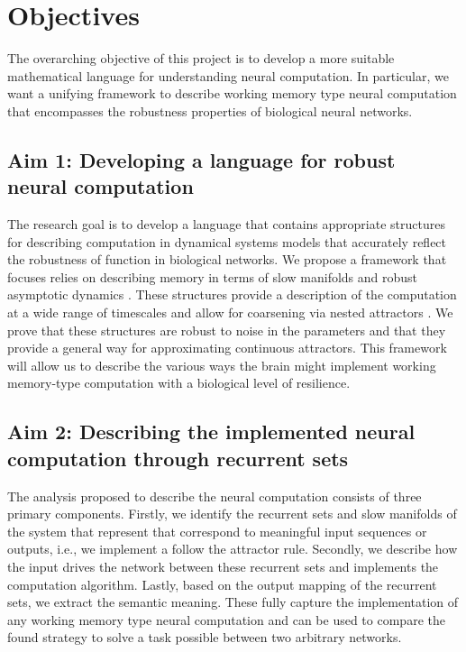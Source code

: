 \documentclass[12pt,letterpaper, onecolumn]{article}
\theoremstyle{definition}
\theoremstyle{remark}
\begin{document}
%


\newpage
\section{Objectives}
The overarching objective of this project is to develop a more suitable mathematical language for understanding neural computation. In particular, we want a unifying framework to describe working memory type neural computation that encompasses the robustness properties of biological neural networks.

\subsection*{Aim 1: Developing a language for robust neural computation}
The research goal is to develop a language that contains appropriate structures for describing computation in dynamical systems models that accurately reflect the robustness of function in biological networks.
We propose a framework that focuses relies on describing memory in terms of slow manifolds \citep{ghazizadeh2021slow} and robust asymptotic dynamics \citep{casey1996}.
These structures provide a description of the computation at a wide range of timescales and allow for coarsening via nested attractors \citep{braun2010}.
We prove that these structures are robust to noise in the parameters \citep{Park2023a} and that they provide a general way for approximating continuous attractors.
This framework will allow us to describe the various ways the brain might implement working memory-type computation with a biological level of resilience.


\subsection*{Aim 2: Describing the implemented neural computation through recurrent sets}
The analysis proposed to describe the neural computation consists of three primary components. Firstly, we identify the recurrent sets and slow manifolds of the system that represent that correspond to meaningful input sequences or outputs, i.e., we implement a follow the attractor rule. Secondly, we describe how the input drives the network between these recurrent sets and implements the computation algorithm. Lastly, based on the output mapping of the recurrent sets, we extract the semantic meaning.
These fully capture the implementation of any working memory type neural computation and can be used to compare the found strategy to solve a task possible between two arbitrary networks.
\end{document}
